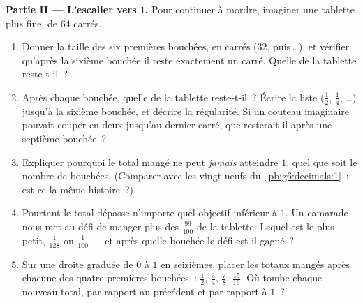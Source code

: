 \begin{problem}
\medskip
\noindent\textbf{Partie II --- L'escalier vers $1$.}
Pour continuer à mordre, imaginer une tablette plus fine, de $64$
carrés.
\begin{enumerate}[resume]
  \item Donner la taille des six premières bouchées, en carrés
        ($32$, puis\,\dots), et vérifier qu'après la sixième bouchée
        il reste exactement un carré. Quelle  de la tablette
        reste-t-il~?
  \item Après chaque bouchée, quelle  de la tablette
        reste-t-il~? Écrire la liste ($\frac12$, $\frac14$, \dots)
        jusqu'à la sixième bouchée, et décrire la régularité. Si un
        couteau imaginaire pouvait couper en deux jusqu'au dernier
        carré, que resterait-il après une septième bouchée~?
  \item Expliquer pourquoi le total mangé ne peut \emph{jamais}
        atteindre $1$, quel que soit le nombre de bouchées.
        (Comparer avec les vingt neufs du~\cref{pb:g6:decimals:1}~:
        est-ce la même histoire~?)
  \item Pourtant le total dépasse n'importe quel objectif inférieur
        à $1$. Un camarade nous met au défi de manger plus des
        $\frac{99}{100}$ de la tablette. Lequel est le plus petit,
        $\frac{1}{128}$ ou $\frac{1}{100}$ --- et après quelle
        bouchée le défi est-il gagné~?
  \item Sur une droite graduée de $0$ à $1$ en seizièmes, placer les
        totaux mangés après chacune des quatre premières bouchées~:
        $\frac12$, $\frac34$, $\frac78$, $\frac{15}{16}$. Où tombe
        chaque nouveau total, par rapport au précédent et par
        rapport à $1$~?
\end{enumerate}


\end{problem}
